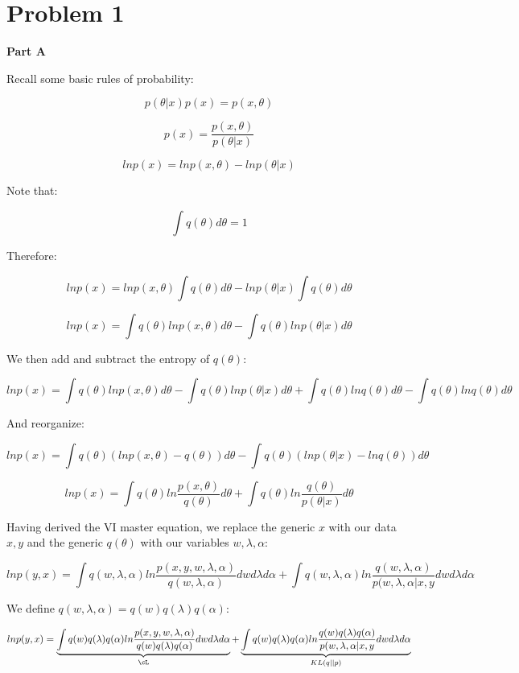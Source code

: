 \documentclass[twoside,11pt]{homework}
\begin{document}
\maketitle

\section*{Problem 1}

\textbf{Part A}

Recall some basic rules of probability:

\[
p(\theta | x)p(x) = p(x, \theta)
\]

\[
p(x) = \frac{p(x, \theta)}{p(\theta | x)}
\]

\[
lnp(x) = lnp(x, \theta) - lnp(\theta | x)
\]

Note that:

\[
\int q(\theta) d\theta = 1
\]

Therefore:

\[
lnp(x) = lnp(x, \theta)\int q(\theta) d\theta - lnp(\theta | x)\int q(\theta) d\theta
\]

\[
lnp(x) = \int q(\theta) lnp(x, \theta) d\theta - \int q(\theta) lnp(\theta | x) d\theta
\]

We then add and subtract the entropy of $q(\theta)$:

\[
lnp(x) = \int q(\theta) lnp(x, \theta) d\theta - \int q(\theta) lnp(\theta | x) d\theta
+ \int q(\theta) lnq(\theta) d\theta - \int q(\theta) lnq(\theta) d\theta
\]

And reorganize:

\[
lnp(x) = \int q(\theta) (lnp(x, \theta) - q(\theta))d\theta - \int q(\theta) (lnp(\theta | x) - lnq(\theta)) d\theta
\]

\[
lnp(x) = \int q(\theta) ln\frac{p(x, \theta)}{q(\theta)} d\theta
 + \int q(\theta) ln\frac{q(\theta)}{p(\theta | x)} d\theta
\]

Having derived the VI master equation, we replace the generic $x$ with our data $x, y$ and the generic $q(\theta)$ with our variables $w, \lambda, \alpha$:

\[
lnp(y, x) = 
\int q(w, \lambda, \alpha) ln \frac{p(x,y,w, \lambda, \alpha)}{q(w, \lambda, \alpha)} dw d\lambda d\alpha
+ \int q(w, \lambda, \alpha) ln \frac{q(w, \lambda, \alpha)}{p(w, \lambda, \alpha | x, y} dw d\lambda d\alpha
\]

We define $q(w, \lambda, \alpha) = q(w)q(\lambda)q(\alpha)$:

\begin{equation}
lnp(y, x) = 
\underbrace{
\int q(w)q(\lambda)q(\alpha) ln \frac{p(x,y,w, \lambda, \alpha)}{q(w)q(\lambda)q(\alpha)} dw d\lambda d\alpha
}_{\cL}
+ \underbrace{
\int q(w)q(\lambda)q(\alpha) ln \frac{q(w)q(\lambda)q(\alpha)}{p(w, \lambda, \alpha | x, y} dw d\lambda d\alpha
}_{KL(q||p)}
\end{equation}
\end{document}
